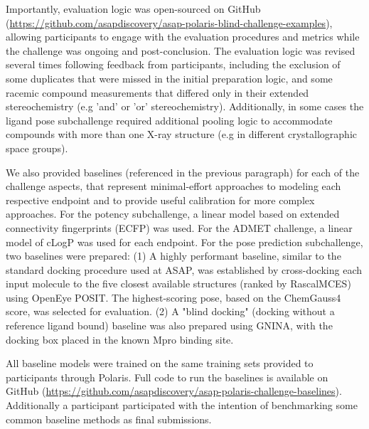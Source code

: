 \documentclass[journal=jcim,manuscript=article]{achemso}
\begin{document}
Importantly, evaluation logic was open-sourced on GitHub (\url{https://github.com/asapdiscovery/asap-polaris-blind-challenge-examples}), allowing participants to engage with the evaluation procedures and metrics while the challenge was ongoing and post-conclusion. The evaluation logic was revised several times following feedback from participants, including the exclusion of some duplicates that were missed in the initial preparation logic, and some racemic compound measurements that differed only in their extended stereochemistry (e.g 'and' or 'or' stereochemistry). Additionally, in some cases the ligand pose subchallenge required additional pooling logic to accommodate compounds with more than one X-ray structure (e.g in different crystallographic space groups). 

We also provided baselines (referenced in the previous paragraph) for each of the challenge aspects, that represent minimal-effort approaches to modeling each respective endpoint and to provide useful calibration for more complex approaches. For the potency subchallenge, a linear model based on extended connectivity fingerprints (ECFP)\cite{ecfp_2010} was used. For the ADMET challenge, a linear model of cLogP\cite{clogp_1999} was used for each endpoint. For the pose prediction subchallenge, two baselines were prepared: (1) A highly performant baseline, similar to the standard docking procedure used at ASAP, was established by cross-docking each input molecule to the five closest available structures (ranked by RascalMCES\cite{raymond_rascal_2002, rdkit}) using OpenEye POSIT\cite{kelley_posit_2015}. The highest-scoring pose, based on the ChemGauss4\cite{oetk} score, was selected for evaluation. (2) A "blind docking" (docking without a reference ligand bound) baseline was also prepared using GNINA\cite{mcnutt_gnina_2025}, with the docking box placed in the known Mpro binding site. 

All baseline models were trained on the same training sets provided to participants through Polaris. Full code to run the baselines is available on GitHub (\url{https://github.com/asapdiscovery/asap-polaris-challenge-baselines}). Additionally a participant participated with the intention of benchmarking some common baseline methods as final submissions\cite{beauty_baseline_2025}. 

\end{document}
